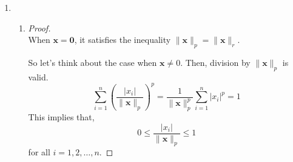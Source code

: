 \documentclass[11pt]{article}
\newcommand{\norm}[2][]{\lVert#2\rVert_{#1}}
\begin{document}
\begin{enumerate}
\begin{proof}
\begin{align*}
        \norm{\bm x}
        & =\frac{1}{2}(\norm{\bm x}+\norm{\bm x}) \\
        & =\frac{1}{2}(\norm{\bm x}+\norm{\bm{-x}})
        && (\because \text{Homogeneity: }
        \norm{(-1)\cdot\bm x}=|-1|\cdot\norm{\bm x}=\norm{\bm x}) \\
        & \ge \frac{1}{2}\norm{\bm x+(\bm{-x})}
        && (\because \text{Subadditivity})\\
        & =\frac{1}{2}\norm{\bm 0} \\
        & = 0
    \end{align*}\end{proof}
\item
    \begin{enumerate}
    \item\begin{proof}$ $\\
    When $\bm x=\bm 0$,
    it satisfies the inequality $\norm[p]{\bm x}=\norm[r]{\bm x}$.
    
    So let's think about the case when $\bm x \neq 0$.
    Then, division by $\norm[p]{\bm x}$ is valid. \\
    \[\sum_{i=1}^{n}\left(\frac{|x_{i}|}{\norm[p]{\bm x}}\right)^{p}
    =\frac{1}{\norm[p]{\bm x}^{p}}\sum_{i=1}^{n}|x_{i}|^{p}
    =1\]
    This implies that,
    \[0 \le \frac{|x_{i}|}{\norm[p]{\bm x}} \le 1\]
    for all $i=1,2,\dots,n$.
    

\end{proof}
\end{enumerate}
\end{enumerate}
\end{document}
